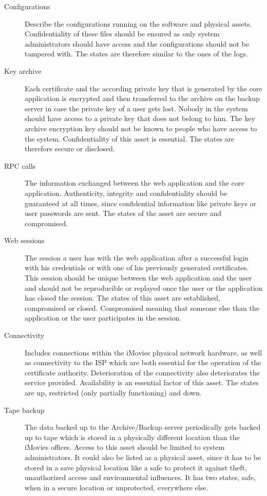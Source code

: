 \documentclass[a4paper, toc=index, 12pt, DIV14, twoside, BCOR2cm, headsepline, numbers=noenddot, bibliography=totoc]{report}
\begin{document}
\begin{description}
\item[Configurations ] Describe the configurations running on the software and physical assets. Confidentiality of these files should be ensured as only system administrators should have access and the configurations should not be tampered with. The states are therefore similar to the ones of the logs.
\item[Key archive ] Each certificate and the according private key that is generated by the core application is encrypted and then transferred to the archive on the backup server in case the private key of a user gets lost. Nobody in the system should have access to a private key that does not belong to him. The key archive encryption key should not be known to people who have access to the system. Confidentiality of this asset is essential. The states are therefore secure or disclosed.
\item[RPC calls ] The information exchanged between the web application and the core application. Authenticity, integrity and confidentiality should be guaranteed at all times, since confidential information like private keys or user passwords are sent. The states of the asset are secure and compromised.
\item[Web sessions ] The session a user has with the web application after a successful login with his credentials or with one of his previously generated certificates. This session should be unique between the web application and the user and should not be reproducible or replayed once the user or the application has closed the session. The states of this asset are established, compromised or closed. Compromised meaning that someone else than the application or the user participates in the session.
\item[Connectivity ] Includes connections within the iMovies physical network hardware, as well as connectivity to the ISP which are both essential for the operation of the certificate authority. Deterioration of the connectivity also deteriorates the service provided. Availability is an essential factor of this asset. The states are up, restricted (only partially functioning) and down.
\item[Tape backup ] The data backed up to the Archive/Backup server periodically gets backed up to tape which is stored in a physically different location than the iMovies offices. Access to this asset should be limited to system administrators. It could also be listed as a physical asset, since it has to be stored in a save physical location like a safe to protect it against theft, unauthorized access and environmental influences. It has two states, safe, when in a secure location or unprotected, everywhere else.

\end{description}
\end{document}
